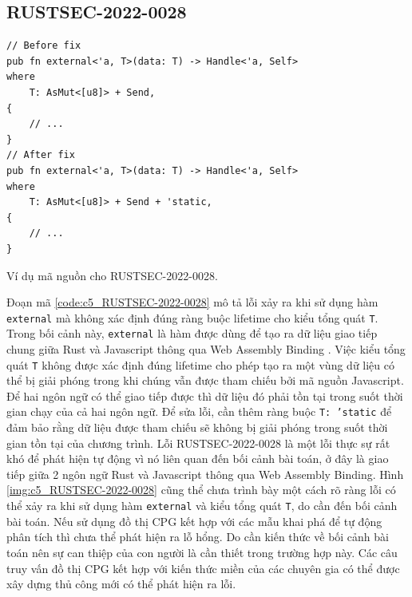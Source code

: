 \subsection{RUSTSEC-2022-0028}

\begin{listing}[H]
\begin{verbatim}
// Before fix
pub fn external<'a, T>(data: T) -> Handle<'a, Self>
where
    T: AsMut<[u8]> + Send,
{
    // ...
}
// After fix
pub fn external<'a, T>(data: T) -> Handle<'a, Self>
where
    T: AsMut<[u8]> + Send + 'static,
{
    // ...
}
\end{verbatim}
\caption{Ví dụ mã nguồn cho RUSTSEC-2022-0028.}
\label{code:c5_RUSTSEC-2022-0028}
\end{listing}

Đoạn mã \ref{code:c5_RUSTSEC-2022-0028} mô tả lỗi xảy ra khi sử dụng hàm \texttt{external} mà không xác định đúng ràng buộc lifetime cho kiểu tổng quát \texttt{T}.
Trong bối cảnh này, \texttt{external} là hàm được dùng để tạo ra dữ liệu giao tiếp chung giữa Rust và Javascript thông qua Web Assembly Binding \cite{ githubGitHubRustwasmwasmbindgen}.
Việc kiểu tổng quát \texttt{T} không được xác định đúng lifetime cho phép tạo ra một vùng dữ liệu có thể bị giải phóng trong khi chúng vẫn được tham chiếu bởi mã nguồn Javascript.
Để hai ngôn ngữ có thể giao tiếp được thì dữ liệu đó phải tồn tại trong suốt thời gian chạy của cả hai ngôn ngữ.
Để sửa lỗi, cần thêm ràng buộc \texttt{T: 'static} để đảm bảo rằng dữ liệu được tham chiếu sẽ không bị giải phóng trong suốt thời gian tồn tại của chương trình.
Lỗi RUSTSEC-2022-0028 là một lỗi thực sự rất khó để phát hiện tự động vì nó liên quan đến bối cảnh bài toán, ở đây là giao tiếp giữa 2 ngôn ngữ Rust và Javascript thông qua Web Assembly Binding.
Hình \ref{img:c5_RUSTSEC-2022-0028} cũng thể chưa trình bày một cách rõ ràng lỗi có thể xảy ra khi sử dụng hàm \texttt{external} và kiểu tổng quát \texttt{T}, do cần đến bối cảnh bài toán.
Nếu sử dụng đồ thị CPG kết hợp với các mẫu khai phá để tự động phân tích thì chưa thể phát hiện ra lỗ hổng.
Do cần kiến thức về bối cảnh bài toán nên sự can thiệp của con người là cần thiết trong trường hợp này.
Các câu truy vấn đồ thị CPG kết hợp với kiến thức miền của các chuyên gia có thể được xây dựng thủ công mới có thể phát hiện ra lỗi.


